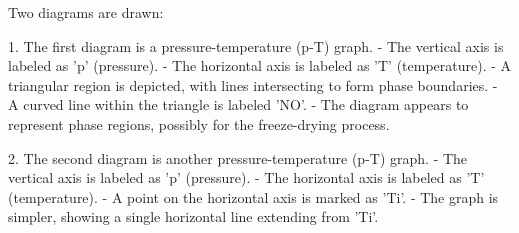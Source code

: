 Two diagrams are drawn:

1. The first diagram is a pressure-temperature (p-T) graph.  
   - The vertical axis is labeled as 'p' (pressure).  
   - The horizontal axis is labeled as 'T' (temperature).  
   - A triangular region is depicted, with lines intersecting to form phase boundaries.  
   - A curved line within the triangle is labeled 'NO'.  
   - The diagram appears to represent phase regions, possibly for the freeze-drying process.

2. The second diagram is another pressure-temperature (p-T) graph.  
   - The vertical axis is labeled as 'p' (pressure).  
   - The horizontal axis is labeled as 'T' (temperature).  
   - A point on the horizontal axis is marked as 'Ti'.  
   - The graph is simpler, showing a single horizontal line extending from 'Ti'.
